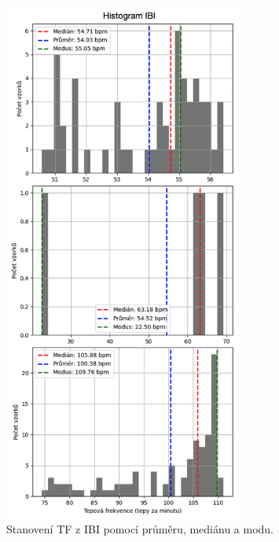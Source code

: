 \begin{figure}[b]
	\centering
	\includegraphics[width=0.7\textwidth]{./obrazky/HR_Hist.png}
	\caption[Histogram \acs{IBI}]{Stanovení \acs{TF} z \acs{IBI} pomocí průměru, mediánu a modu.}
	\vspace{-5mm}
	\label{fig:HR_hist}
\end{figure}


